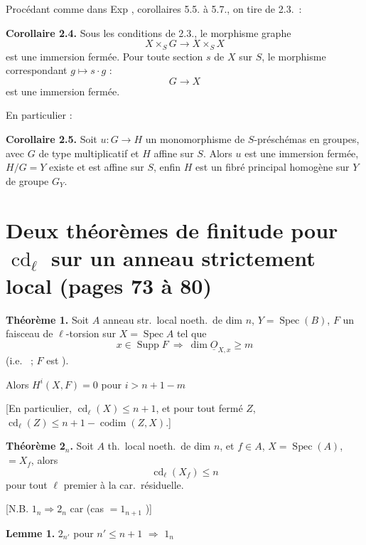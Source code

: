 \documentclass[11pt,a4paper]{article}
\begin{document}
Procédant comme dans Exp , corollaires 5.5. à 5.7., on tire de 2.3.\ :

\textbf{Corollaire 2.4.} Sous les conditions de 2.3., le morphisme graphe
\[
X \times_{S} G \longrightarrow X \times_{S} X
\]
est une immersion fermée. Pour toute section $s$ de $X$ sur $S$, le morphisme
correspondant $g \mapsto s \cdot g$ :
\[
G \longrightarrow X
\]
est une immersion fermée.

En particulier :

\textbf{Corollaire 2.5.} Soit $u : G \to H$ un monomorphisme de
$S$-préschémas en groupes, avec $G$ de type multiplicatif et $H$ affine sur
$S$. Alors $u$ est une immersion fermée,  $H/G = Y$ existe et est
affine sur $S$, enfin $H$ est un fibré principal homogène sur $Y$ de groupe
$G_{Y}$.

\section*{Deux théorèmes de finitude pour $\operatorname{cd}_{\ell}$ sur un anneau strictement local (pages 73 à 80)}

\textbf{Théorème 1.} Soit $A$ anneau str.\ local noeth.\ de dim $n$,
$Y = \operatorname{Spec}(B)$,  $F$ un faisceau de
$\ell$-torsion sur $X = \operatorname{Spec} A$  tel que
\[
x \in \operatorname{Supp} F \ \Longrightarrow\ \dim \underline{O}_{X,x}
\geqslant m
\]
(i.e.\ \ill{} ; $F$ est ).

Alors $H^{i}(X,F) = 0$ pour $i > n + 1 - m$ 

[En particulier, $\operatorname{cd}_{\ell}(X) \leqslant n+1$, et pour tout
fermé $Z$, $\operatorname{cd}_{\ell}(Z) \leqslant n + 1 -
\operatorname{codim}(Z,X)$.]

\textbf{Théorème 2$_{n}$.} Soit $A$ \ill{} th.\ local noeth.\ de dim $n$, et
\struck{\ill{}} $f \in A$, $X = \operatorname{Spec}(A)$, \struck{$M$} $=
X_{f}$, alors
\[
\operatorname{cd}_{\ell}(X_{f}) \leqslant n
\]
pour tout $\ell$ premier à la car.\ résiduelle.

[N.B. $1_{n} \Rightarrow 2_{n}$ car \ill{} (cas \ill{} $= 1_{n+1}$ \ill{})]

\textbf{Lemme 1.} $2_{n'}$ pour $n' \leqslant n+1$ $\Rightarrow$ $1_{n}$
\quad \ill{}
\end{document}
